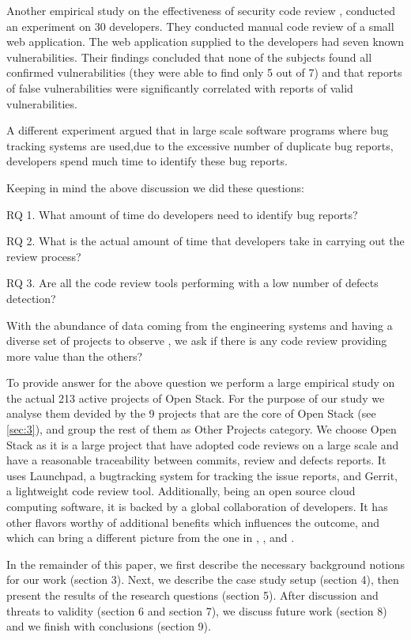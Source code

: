 \documentclass[ifip]{svmult}
\begin{document}
Another empirical study on the effectiveness of security code review \cite{contribution1}, conducted an experiment on 30 developers. They 
conducted manual code review of a small web application. The web application supplied to the developers had seven known vulnerabilities. 
Their findings concluded that none of the subjects found all confirmed vulnerabilities (they were able to find only 5 out of 7) 
and that reports of false vulnerabilities were significantly correlated with reports of valid vulnerabilities.

A different experiment \cite{contribution10} argued that in large scale software programs where bug tracking systems 
are used,due to the excessive number of duplicate bug reports, developers spend much time to identify these bug reports. 

Keeping in mind the above discussion we did these questions:

RQ 1. What amount of time do developers need to identify bug reports?

RQ 2. What is the actual amount of time that developers take in carrying out the review process?

RQ 3. Are all the code review tools performing with a low number of defects detection?

With the abundance of data coming from the engineering systems and having a diverse set of projects to observe 
\cite{contribution12} \cite{contribution13}, we ask 
if there is any code review providing more value than the others?

To provide answer for the above question we perform a large empirical study on the actual 213 active projects of Open Stack.
For the purpose of our study we analyse them devided by the 9 projects that are the core of Open Stack (see \ref{sec:3}), and 
group the rest of them as Other Projects category.  
We choose Open Stack as it is a large project that have adopted code reviews on a large 
scale and have a reasonable traceability between commits, review and defects reports.
It uses Launchpad, a bugtracking system for tracking the issue reports, and Gerrit, a lightweight code review tool. Additionally, 
being an open source cloud computing software, it is backed by a global collaboration of developers. It has other flavors worthy of 
additional benefits which influences the outcome, and which can bring a different picture from the one in \cite{contribution1}, 
\cite{contribution9}, \cite{contribution20} and \cite{contribution10}. 

In the remainder of this paper, we first describe the necessary background notions for our work (section 3). Next, we describe the 
case study setup (section 4), then present the results of the research questions (section 5). After discussion and threats to 
validity (section 6 and section 7), we discuss future work (section 8) and we finish with conclusions (section 9).
\end{document}
